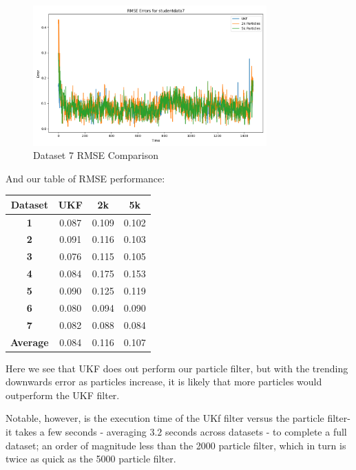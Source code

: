 \documentclass{article}
\begin{document}
\begin{figure}[H]
    \centering
    \includegraphics[width=0.8\textwidth]{./imgs/task3/studentdata7_rmse.png}
    \caption{Dataset 7 RMSE Comparison}
\end{figure}

And our table of RMSE performance:

\begin{table}[H]
    \centering
    \begin{tabular}{|c|c|c|c|}
        \hline
        \textbf{Dataset} & \textbf{UKF} & \textbf{2k} & \textbf{5k} \\ \hline
        \textbf{1}       & 0.087        & 0.109       & 0.102       \\ \hline
        \textbf{2}       & 0.091        & 0.116       & 0.103       \\ \hline
        \textbf{3}       & 0.076        & 0.115       & 0.105       \\ \hline
        \textbf{4}       & 0.084        & 0.175       & 0.153       \\ \hline
        \textbf{5}       & 0.090        & 0.125       & 0.119       \\ \hline
        \textbf{6}       & 0.080        & 0.094       & 0.090       \\ \hline
        \textbf{7}       & 0.082        & 0.088       & 0.084       \\ \hline
        \textbf{Average} & 0.084        & 0.116       & 0.107       \\ \hline
    \end{tabular}
\end{table}

Here we see that UKF does out perform our particle filter, but with the trending downwards error as particles increase, it is likely that more particles would outperform the UKF filter.

Notable, however, is the execution time of the UKf filter versus the particle filter- it takes a few seconds - averaging $3.2$ seconds across datasets - to complete a full dataset; an order of magnitude less than the 2000 particle filter, which in turn is twice as quick as the 5000 particle filter.
\end{document}
